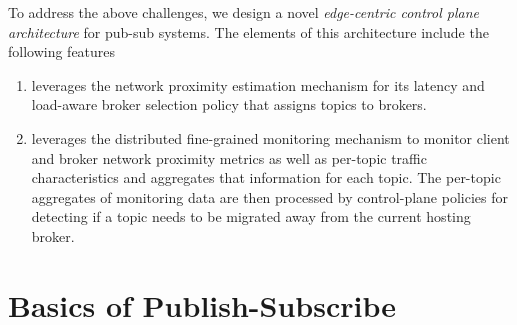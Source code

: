 \par To address the above challenges, we design a novel \textit{edge-centric control plane architecture} for pub-sub systems.  The elements of this architecture include the following features
\begin{enumerate}
\item \epulsar leverages the network proximity estimation mechanism for its latency and load-aware broker selection policy that assigns topics to brokers. 
\item \epulsar leverages the distributed fine-grained monitoring mechanism to monitor client and broker network proximity metrics as well as per-topic traffic characteristics and aggregates that information for each topic. The per-topic aggregates of monitoring data are then processed by control-plane policies for detecting if a topic needs to be migrated away from the current hosting broker.
\end{enumerate}

\section{Basics of Publish-Subscribe}

